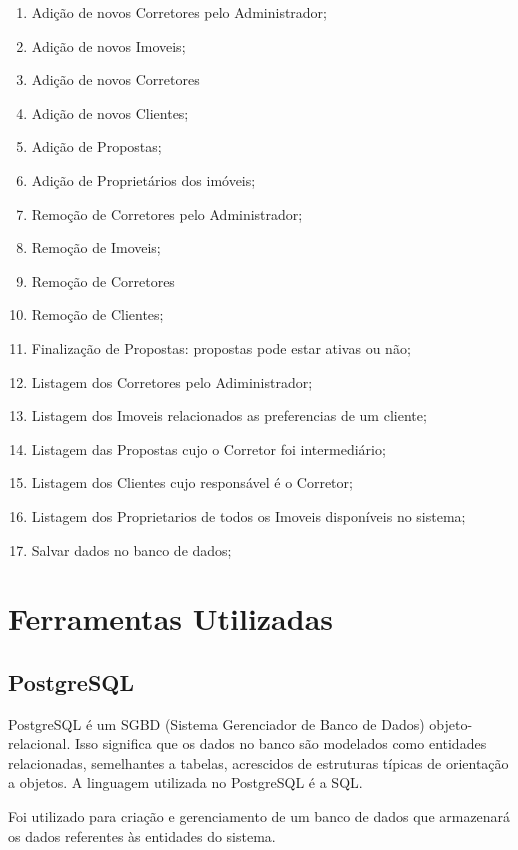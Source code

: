 \documentclass[a4paper,11pt,fleqn]{article}
\begin{document}
\begin{enumerate}
    \item Adição de novos Corretores pelo Administrador;
    \item Adição de novos Imoveis;
    \item Adição de novos Corretores
    \item Adição de novos Clientes;
    \item Adição de Propostas;
    \item Adição de Proprietários dos imóveis;
    \item Remoção de Corretores pelo Administrador;
    \item Remoção de Imoveis;
    \item Remoção de Corretores
    \item Remoção de Clientes;
    \item Finalização de Propostas: propostas pode estar ativas ou não;
    \item Listagem dos Corretores pelo Adiministrador;
    \item Listagem dos Imoveis relacionados as preferencias de um cliente;
    \item Listagem das Propostas cujo o Corretor foi intermediário;
    \item Listagem dos Clientes cujo responsável é o Corretor;
    \item Listagem dos Proprietarios de todos os Imoveis disponíveis no sistema;
    \item Salvar dados no banco de dados;
\end{enumerate}

\section{Ferramentas Utilizadas}
\label{s:ferramentas}

\subsection{PostgreSQL}
\label{ss:postgre}

PostgreSQL é um SGBD (Sistema Gerenciador de Banco de Dados) objeto-relacional. Isso significa que os dados no banco são modelados como entidades relacionadas, semelhantes
 a tabelas, acrescidos de estruturas típicas de orientação a objetos. A linguagem utilizada no PostgreSQL é a SQL.

 Foi utilizado para criação e gerenciamento de um banco de dados que armazenará os dados referentes às entidades do sistema.
\end{document}
